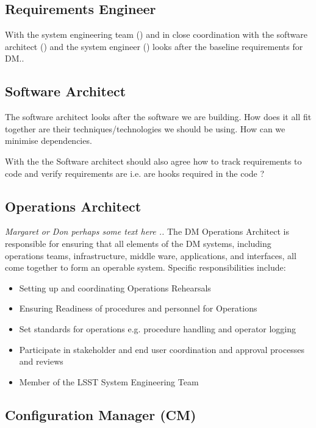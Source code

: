 \subsection{Requirements Engineer \label{role:reqeng}}
With the system engineering team () and in close coordination with the software architect () and the system engineer () looks after the baseline requirements for DM.. 




\subsection{Software Architect \label{role:softarc}}
The software architect looks after the software we are building. How does it all fit together are their techniques/technologies we should be using. How can we minimise dependencies. 

With the  the Software architect should also agree how to track requirements to code and verify requirements are i.e. are hooks required in the code ?

\subsection{Operations Architect \label{role:opsarc}}
{\em Margaret  or Don perhaps some text here .. }
The DM Operations  Architect is responsible for ensuring that all elements of the DM systems, including operations teams, infrastructure, middle ware, applications, and interfaces, 
all come together to form an operable system. 
Specific responsibilities include:
\begin{itemize}
\item Setting up and coordinating  Operations Rehearsals
\item Ensuring Readiness of procedures and personnel for Operations
\item Set standards for operations e.g. procedure handling and operator logging
\item Participate in stakeholder and end user coordination and approval processes and reviews
\item Member of the LSST System Engineering Team
\end{itemize}


\subsection{Configuration Manager (CM)}\label{role:cm}


